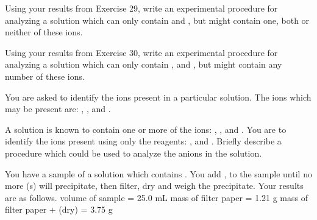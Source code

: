 \documentclass[fleqn]{exam}
\begin{document}
\begin{questions}
  \question Using your results from Exercise 29, write an experimental procedure for analyzing a solution which can only contain  and , but might contain one, both or neither of these ions.
  \vspace{1.5in}

  \question Using your results from Exercise 30, write an experimental procedure for analyzing a solution which can only contain ,  and , but might contain any number of these ions.
  \vspace{1.5in}

  \question You are asked to identify the ions present in a particular solution. The ions which may be present are: , , and .

  \question A solution is known to contain one or more of the ions: ,  ,  and . You are to identify the ions present using only the reagents:   ,  and . Briefly describe a procedure which could be used to analyze the anions in the solution.
  \vspace{1.5in}
  \newpage

  \question You have a sample of a solution which contains . You add , to the sample until no more (s) will precipitate, then filter, dry and weigh the precipitate. Your results are as follows. \newline
  volume of sample = 25.0 mL \newline
  mass of filter paper = 1.21 g \newline
  mass of filter paper +  (dry) = 3.75 g \newline


\end{questions}
\end{document}
